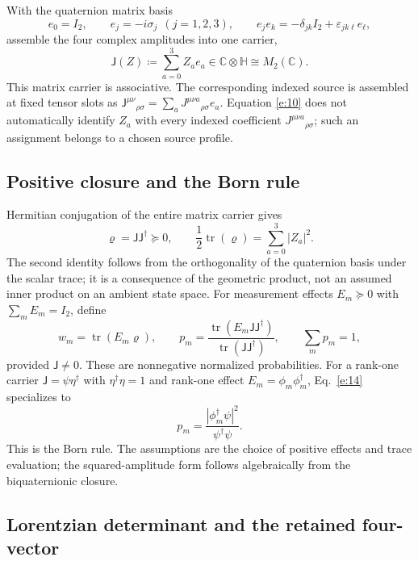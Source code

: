 \documentclass[10pt]{article}
\newcommand{\sJ}{\mathsf{J}}
\newcommand{\tr}{\operatorname{tr}}
\begin{document}
With the quaternion matrix basis
\begin{equation}
e_0=I_2,\qquad e_j=-i\sigma_j\ \ (j=1,2,3),\qquad e_je_k=-\delta_{jk}I_2+\varepsilon_{jk\ell}e_\ell,\label{e:11}
\end{equation}
assemble the four complex amplitudes into one carrier,
\begin{equation}
\sJ(Z)\coloneqq\sum_{a=0}^{3}Z_ae_a\in\mathbb C\otimes\mathbb H\cong M_2(\mathbb C).\label{e:12}
\end{equation}
This matrix carrier is associative. The corresponding indexed source is assembled at fixed tensor slots as $\sJ^{\mu\nu}{}_{\rho\sigma}=\sum_aJ^{\mu\nu a}{}_{\rho\sigma}e_a$. Equation \eqref{e:10} does not automatically identify $Z_a$ with every indexed coefficient $J^{\mu\nu a}{}_{\rho\sigma}$; such an assignment belongs to a chosen source profile.

\subsection*{Positive closure and the Born rule}

Hermitian conjugation of the entire matrix carrier gives
\begin{equation}
\varrho=\sJ\sJ^\dagger\succeq0,\qquad \frac12\tr(\varrho)=\sum_{a=0}^{3}|Z_a|^2.\label{e:13}
\end{equation}
The second identity follows from the orthogonality of the quaternion basis under the scalar trace; it is a consequence of the geometric product, not an assumed inner product on an ambient state space. For measurement effects $E_m\succeq0$ with $\sum_mE_m=I_2$, define
\begin{equation}
w_m=\tr(E_m\varrho),\qquad p_m=\frac{\tr(E_m\sJ\sJ^\dagger)}{\tr(\sJ\sJ^\dagger)},\qquad \sum_mp_m=1,\label{e:14}
\end{equation}
provided $\sJ\neq0$. These are nonnegative normalized probabilities. For a rank-one carrier $\sJ=\psi\eta^\dagger$ with $\eta^\dagger\eta=1$ and rank-one effect $E_m=\phi_m\phi_m^\dagger$, Eq.~\eqref{e:14} specializes to
\begin{equation}
p_m=\frac{|\phi_m^\dagger\psi|^2}{\psi^\dagger\psi}.\label{e:15}
\end{equation}
This is the Born rule. The assumptions are the choice of positive effects and trace evaluation; the squared-amplitude form follows algebraically from the biquaternionic closure.

\subsection*{Lorentzian determinant and the retained four-vector}
\end{document}
